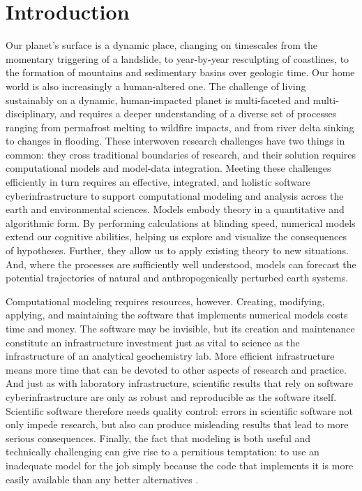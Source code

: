 \documentclass[12pt]{amsart}
\begin{document}
\section{Introduction}

Our planet's surface is a dynamic place, changing on timescales from the momentary triggering of a landslide, to year-by-year resculpting of coastlines, to the formation of mountains and sedimentary basins over geologic time. Our home world is also increasingly a human-altered one.  The challenge of living sustainably on a dynamic, human-impacted planet is multi-faceted and multi-disciplinary, and requires a deeper understanding of a diverse set of processes ranging from permafrost melting to wildfire impacts, and from river delta sinking to changes in flooding. These interwoven research challenges have two things in common: they cross traditional boundaries of research, and their solution requires computational models and model-data integration. Meeting these challenges efficiently in turn requires an effective, integrated, and holistic software cyberinfrastructure to support computational modeling and analysis across the earth and environmental sciences. Models embody theory in a quantitative and algorithmic form. By performing calculations at blinding speed, numerical models extend our cognitive abilities, helping us explore and visualize the consequences of hypotheses. Further, they allow us to apply existing theory to new situations. And, where the processes are sufficiently well understood, models can forecast the potential trajectories of natural and anthropogenically perturbed earth systems.

Computational modeling requires resources, however. Creating, modifying, applying, and maintaining the software that implements numerical models costs time and money. The software may be invisible, but its creation and maintenance constitute an infrastructure investment just as vital to science as the infrastructure of an analytical geochemistry lab. More efficient infrastructure means more time that can be devoted to other aspects of research and practice. And just as with laboratory infrastructure, scientific results that rely on software cyberinfrastructure are only as robust and reproducible as the software itself. Scientific software therefore needs quality control: errors in scientific software not only impede research, but also can produce misleading results that lead to more serious consequences. Finally, the fact that modeling is both useful and technically challenging can give rise to a pernitious temptation: to use an inadequate model for the job simply because the code that implements it is more easily available than any better alternatives \citep{addor2019legacy}. 
\end{document}

